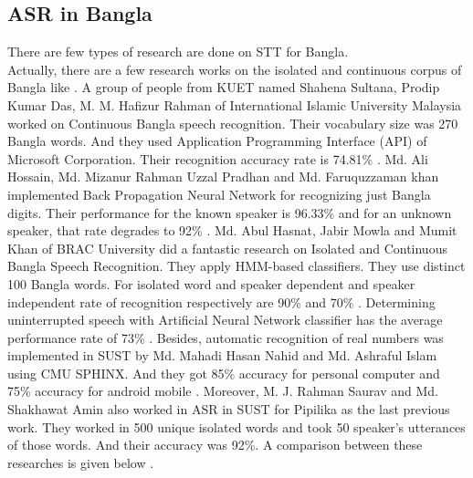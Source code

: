 \documentclass{standalone}
\begin{document}
\subsection{ASR in Bangla}
There are few types of research are done on STT for Bangla.
\\
Actually, there are a few research works on the isolated and continuous corpus of Bangla like \cite{das2011bengali, sultana2012bangla, shrishrimal2012indian, rahman2003continuous, huang2014historical, sinha2014speech, islam2009research, hasnat2007isolated, lee1988automatic, karim2002recognition, juang2005automatic}.
A group of people from KUET named Shahena Sultana, Prodip Kumar Das, M. M. Hafizur Rahman of International Islamic University Malaysia worked on Continuous Bangla speech recognition. Their vocabulary size was 270 Bangla words. And they used Application Programming Interface (API) of Microsoft Corporation. Their recognition accuracy rate is 74.81\% \cite{sultana2012bangla}. Md. Ali Hossain, Md. Mizanur Rahman Uzzal Pradhan and Md. Faruquzzaman khan implemented Back Propagation Neural Network for recognizing just Bangla digits. Their performance for the known speaker is 96.33\% and for an unknown speaker, that rate degrades to 92\% \cite{hossain2013implementation}. Md. Abul Hasnat, Jabir Mowla and Mumit Khan of BRAC University did a fantastic research on Isolated and Continuous Bangla Speech Recognition. They apply  HMM-based classifiers. They use distinct 100 Bangla words. For isolated word and speaker dependent and speaker independent rate of recognition respectively are 90\% and 70\% \cite{hasnat2007isolated}. Determining uninterrupted speech with Artificial Neural Network classifier has the average performance rate of 73\% \cite{rahman2003continuous}. Besides, automatic recognition of real numbers was implemented in SUST by Md. Mahadi
Hasan Nahid and Md. Ashraful Islam using CMU SPHINX. And they got 85\% accuracy for personal computer and 75\% accuracy for android mobile \cite{nahid2016noble}. Moreover, M. J. Rahman Saurav and Md. Shakhawat Amin also worked in ASR in SUST for Pipilika as the last previous work. They worked in 500 unique isolated words and took 50 speaker's utterances of those words. And their accuracy was 92\%.
A comparison between these researches is given below \cite{sultana2012bangla}\cite{hossain2013implementation}\cite{hasnat2007isolated}\cite{rahman2003continuous}\cite{nahid2016noble}.
\\
\\
\end{document}
